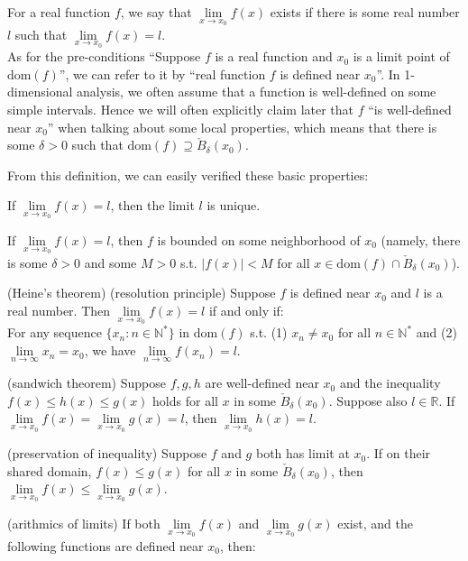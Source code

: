 \documentclass{article}
\begin{document}
\begin{Rmk}{}
    \textcolor{Df}{For a real function $f$, we say that $\lim\limits_{x\to x_0} f(x)$ exists if there is some real number $l$ such that $\lim\limits_{x\to x_0} f(x) = l$.}\\
    \textcolor{Df}{As for the pre-conditions ``Suppose $f$ is a real function and $x_0$ is a limit point of $\text{dom}(f)$'', we can refer to it by ``real function $f$ is defined near $x_0$''.} In 1-dimensional analysis, we often assume that a function is well-defined on some simple intervals. \textcolor{Df}{Hence we will often explicitly claim later that $f$ ``is well-defined near $x_0$'' when talking about some local properties, which means that there is some $\delta>0$ such that $\text{dom}(f)\supseteq \check{B}_\delta(x_0)$.}\\
    \textcolor{Th}{From this definition, we can easily verified these basic properties:
    \begin{compactenum}
        \item If $\lim\limits_{x\rightarrow x_0}f(x) = l$, then the limit $l$ is unique.
        \item If $\lim\limits_{x\rightarrow x_0}f(x) = l$, then $f$ is bounded on some neighborhood of $x_0$ (namely, there is some $\delta>0$ and some $M>0$ s.t. $|f(x)|<M$ for all $x\in\text{dom}(f)\cap\check{B}_\delta(x_0)$).
        \item (Heine's theorem) (resolution principle) Suppose $f$ is defined near $x_0$ and $l$ is a real number. Then $\lim\limits_{x\rightarrow x_0}f(x) = l$ if and only if:\\
        For any sequence $\{x_n:n\in\mathbb{N^\ast}\}$ in $\text{dom}(f)$ s.t. (1) $x_n\neq x_0$ for all $n\in\mathbb{N^\ast}$ and (2) $\lim\limits_{n\rightarrow\infty}x_n = x_0$, we have $\lim\limits_{n\rightarrow\infty}f(x_n) = l$.
        \item (sandwich theorem) Suppose $f, g, h$ are well-defined near $x_0$ and the inequality $f(x)\leq h(x)\leq g(x)$ holds for all $x$ in some $\check{B}_\delta(x_0)$. Suppose also $l\in\mathbb{R}$. If $\lim\limits_{x\to x_0} f(x) = \lim\limits_{x\to x_0} g(x) = l$, then $\lim\limits_{x\to x_0} h(x) = l$.
        \item (preservation of inequality) Suppose $f$ and $g$ both has limit at $x_0$. If on their shared domain, $f(x)\leq g(x)$ for all $x$ in some $\check{B}_\delta(x_0)$, then $\lim\limits_{x\to x_0} f(x) \leq \lim\limits_{x\to x_0} g(x)$.
        \item (arithmics of limits) If both $\lim\limits_{x\rightarrow x_0} f(x)$ and $\lim\limits_{x\rightarrow x_0} g(x)$ exist, and the following functions are defined near $x_0$, then:

\end{compactenum}}
\end{Rmk}
\end{document}
